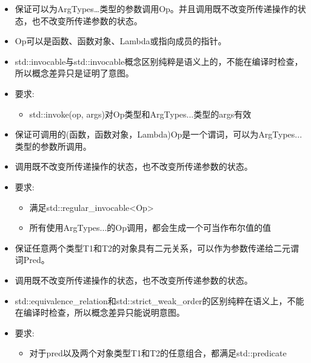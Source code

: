 
\begin{itemize}
\item
保证可以为ArgTypes…类型的参数调用Op。并且调用既不改变所传递操作的状态，也不改变所传递参数的状态。

\item
Op可以是函数、函数对象、Lambda或指向成员的指针。

\item
std::invocable与std::invocable概念区别纯粹是语义上的，不能在编译时检查，所以概念差异只是证明了意图。

\item
要求:
\begin{itemize}
\item
std::invoke(op, args)对Op类型和ArgTypes...类型的args有效
\end{itemize}
\end{itemize}


\begin{itemize}
\item
保证可调用的(函数，函数对象，Lambda)Op是一个谓词，可以为ArgTypes...类型的参数所调用。

\item
调用既不改变所传递操作的状态，也不改变所传递参数的状态。

\item
要求:
\begin{itemize}
\item
满足std::regular\_invocable<Op>

\item
所有使用ArgTypes...的Op调用，都会生成一个可当作布尔值的值
\end{itemize}
\end{itemize}


\begin{itemize}
\item
保证任意两个类型T1和T2的对象具有二元关系，可以作为参数传递给二元谓词Pred。

\item
调用既不改变所传递操作的状态，也不改变所传递参数的状态。

\item
std::equivalence\_relation和std::strict\_weak\_order的区别纯粹在语义上，不能在编译时检查，所以概念差异只能说明意图。

\item
要求:
\begin{itemize}
\item
对于pred以及两个对象类型T1和T2的任意组合，都满足std::predicate
\end{itemize}
\end{itemize}

